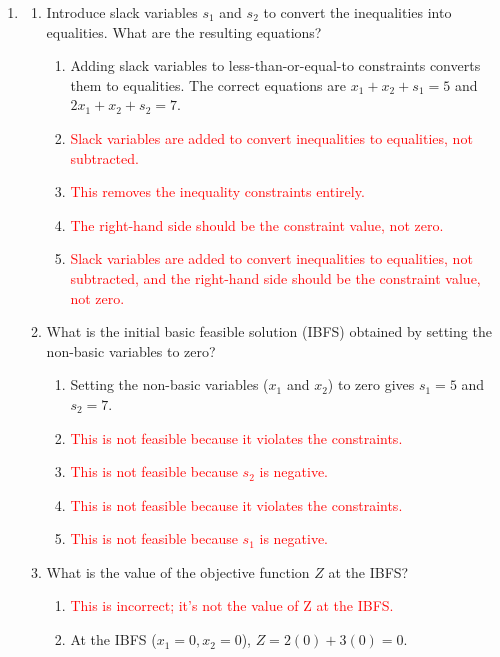 \documentclass{article}%
\newcommand{\incorrect}[1]{\textcolor{red}{#1}}
\begin{document}
\begin{enumerate}
\begin{enumerate}
\end{enumerate}%
\vspace{1em}%
\item%
\begin{enumerate}%
\item Introduce slack variables $s_1$ and $s_2$ to convert the inequalities into equalities. What are the resulting equations?%
\begin{enumerate}%
\item Adding slack variables to less-than-or-equal-to constraints converts them to equalities.  The correct equations are $x_1 + x_2 + s_1 = 5$ and $2x_1 + x_2 + s_2 = 7$.%
\item \incorrect{Slack variables are added to convert inequalities to equalities, not subtracted.}%
\item \incorrect{This removes the inequality constraints entirely.}%
\item \incorrect{The right-hand side should be the constraint value, not zero.}%
\item \incorrect{Slack variables are added to convert inequalities to equalities, not subtracted, and the right-hand side should be the constraint value, not zero.}%
\end{enumerate}%
\vspace{0.5em}%
\item What is the initial basic feasible solution (IBFS) obtained by setting the non-basic variables to zero?%
\begin{enumerate}%
\item Setting the non-basic variables ($x_1$ and $x_2$) to zero gives $s_1 = 5$ and $s_2 = 7$.%
\item \incorrect{This is not feasible because it violates the constraints.}%
\item \incorrect{This is not feasible because $s_2$ is negative.}%
\item \incorrect{This is not feasible because it violates the constraints.}%
\item \incorrect{This is not feasible because $s_1$ is negative.}%
\end{enumerate}%
\vspace{0.5em}%
\item What is the value of the objective function $Z$ at the IBFS?%
\begin{enumerate}%
\item \incorrect{This is incorrect; it's not the value of Z at the IBFS.}%
\item At the IBFS ($x_1 = 0, x_2 = 0$), $Z = 2(0) + 3(0) = 0$.%

\end{enumerate}
\end{enumerate}
\end{enumerate}
\end{document}
